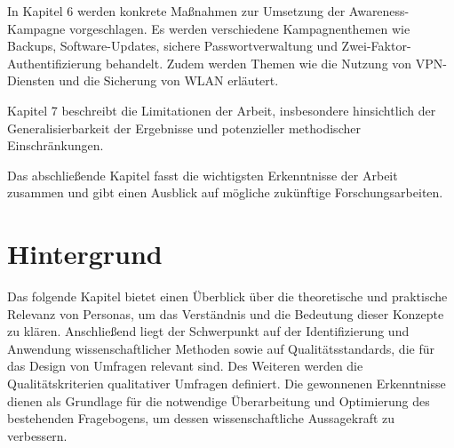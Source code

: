 \documentclass[german,report]{i1thesis}
\begin{document}
In Kapitel 6 werden konkrete Maßnahmen zur Umsetzung der Awareness-Kampagne vorgeschlagen. Es werden verschiedene Kampagnenthemen wie Backups, Software-Updates, sichere Passwortverwaltung und Zwei-Faktor-Authentifizierung behandelt. Zudem werden Themen wie die Nutzung von VPN-Diensten und die Sicherung von WLAN erläutert.

Kapitel 7 beschreibt die Limitationen der Arbeit, insbesondere hinsichtlich der Generalisierbarkeit der Ergebnisse und potenzieller methodischer Einschränkungen.

Das abschließende Kapitel fasst die wichtigsten Erkenntnisse der Arbeit zusammen und gibt einen Ausblick auf mögliche zukünftige Forschungsarbeiten.

\section{Hintergrund} 
\label{sec:background}

Das folgende Kapitel bietet einen Überblick über die theoretische und praktische Relevanz von Personas, um das Verständnis und die Bedeutung dieser Konzepte zu klären. Anschließend liegt der Schwerpunkt auf der Identifizierung und Anwendung wissenschaftlicher Methoden sowie auf Qualitätsstandards, die für das Design von Umfragen relevant sind. Des Weiteren werden die Qualitätskriterien qualitativer Umfragen definiert. Die gewonnenen Erkenntnisse dienen als Grundlage für die notwendige Überarbeitung und Optimierung des bestehenden Fragebogens, um dessen wissenschaftliche Aussagekraft zu verbessern.
\end{document}
